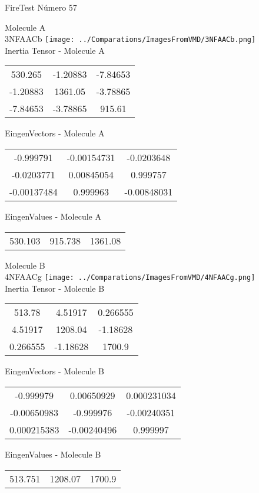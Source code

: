 \vtab[-2cm]
\begin{center}
{\large FireTest \tab Número 57}
\end{center}
\begin{multicols}{2}
\begin{center}

Molecule A \\ 
3NFAACb
\texttt{[image: ../Comparations/ImagesFromVMD/3NFAACb.png]}
\\
Inertia Tensor - Molecule A \\
\vtab

\begin{tabular}{|c c c|}
530.265	 & 	-1.20883	 & 	-7.84653	 \\
-1.20883	 & 	1361.05	 & 	-3.78865	 \\
-7.84653	 & 	-3.78865	 & 	915.61
\end{tabular}

\vtab
 EingenVectors - Molecule A     \\
\vtab
\begin{tabular}{|c c c|}
-0.999791	 & 	-0.00154731	 & 	-0.0203648	 \\
-0.0203771	 & 	0.00845054	 & 	0.999757	 \\
-0.00137484	 & 	0.999963	 & 	-0.00848031
\end{tabular}

\vtab
 EingenValues - Molecule A     \\
\vtab
\begin{tabular}{|c c c|}
530.103	 & 	915.738	 & 	1361.08	 \\
\end{tabular}
\columnbreak

Molecule B \\ 
4NFAACg
\texttt{[image: ../Comparations/ImagesFromVMD/4NFAACg.png]}
\\
Inertia Tensor - Molecule B \\
\vtab

\begin{tabular}{|c c c|}
513.78	 & 	4.51917	 & 	0.266555	 \\
4.51917	 & 	1208.04	 & 	-1.18628	 \\
0.266555	 & 	-1.18628	 & 	1700.9
\end{tabular}

\vtab
 EingenVectors - Molecule B     \\
\vtab
\begin{tabular}{|c c c|}
-0.999979	 & 	0.00650929	 & 	0.000231034	 \\
-0.00650983	 & 	-0.999976	 & 	-0.00240351	 \\
0.000215383	 & 	-0.00240496	 & 	0.999997
\end{tabular}

\vtab
 EingenValues - Molecule B     \\
\vtab
\begin{tabular}{|c c c|}
513.751	 & 	1208.07	 & 	1700.9	 \\
\end{tabular}

\end{center}
\end{multicols}
